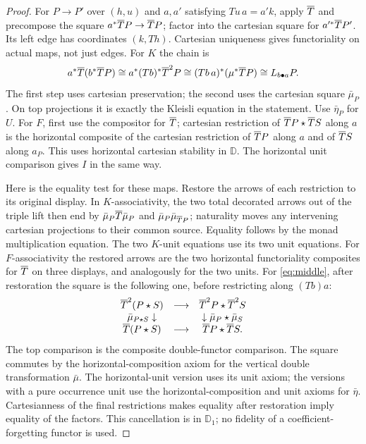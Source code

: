 \documentclass[11pt]{article}
\theoremstyle{definition}\newtheorem{definition}[theorem]{Definition}
\newcommand{\D}{\mathbb D}\newcommand{\N}{\mathbb N}
\newcommand{\st}{\mathbin{\star}}\newcommand{\bx}{\mathop{\boxtimes}}
\begin{document}
\begin{proof}
For $P\to P'$ over $(h,u)$ and $a,a'$ satisfying $Tu\,a=a'k$,
apply $\overline T$ and precompose the square $a^*\overline T P\to\overline T P$;
factor into the cartesian square for $a'^*\overline T P'$. Its left edge
has coordinates $(k,Th)$. Cartesian uniqueness gives functoriality
on actual maps, not just edges. For $K$ the chain is
\[
 a^*\overline T(b^*\overline T P)\cong a^*(Tb)^*\overline T^2P
 \cong (Tb\,a)^*(\mu^*\overline T P)\cong L_{b\bullet a}P .
\]
The first step uses cartesian preservation; the second uses the
cartesian square $\bar\mu_P$. On top projections it is exactly the
Kleisli equation in the statement. Use $\bar\eta_P$ for $U$.
For $F$, first use the compositor for $\overline T$; cartesian restriction
of $\Tt P\st\Tt S$ along $a$ is the horizontal composite of the
cartesian restriction of $\overline T P$ along $a$ and of $\overline T S$ along
$a_P$. This uses horizontal cartesian stability in $\D$. The horizontal
unit comparison gives $I$ in the same way.

Here is the equality test for these maps. Restore the arrows of each
restriction to its original display. In $K$-associativity, the two
total decorated arrows out of the triple lift then end by
$\bar\mu_P\overline T\bar\mu_P$ and $\bar\mu_P\bar\mu_{\overline T P}$;
naturality moves any intervening cartesian projections to their common
source. Equality follows by the monad multiplication equation.
The two $K$-unit equations use its two unit equations.
For $F$-associativity the restored arrows are the two horizontal
functoriality composites for $\overline T$ on three displays, and analogously
for the two units. For \eqref{eq:middle}, after restoration the
square is the following one, before restricting along $(Tb)a$:
\[
\begin{array}{ccc}
 \Tt^2(P\st S)&\longrightarrow&\Tt^2P\st\Tt^2S\\
 \bar\mu_{P\st S}\downarrow&&\downarrow\bar\mu_P\st\bar\mu_S\\
 \Tt(P\st S)&\longrightarrow&\Tt P\st\Tt S .
\end{array}
\]
The top comparison is the composite double-functor comparison.
The square commutes by the horizontal-composition axiom for the vertical
double transformation $\bar\mu$. The horizontal-unit version uses
its unit axiom; the versions with a pure occurrence unit use the
horizontal-composition and unit axioms for $\bar\eta$.
Cartesianness of the final restrictions makes equality after restoration
imply equality of the factors. This cancellation is in $\D_1$;
no fidelity of a coefficient-forgetting functor is used.
\end{proof}
\end{document}
